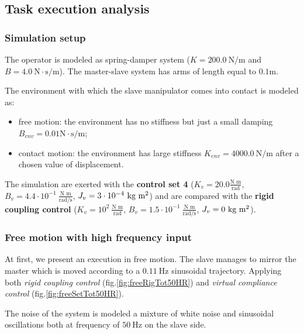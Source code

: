 \subsection{Task execution analysis}

\subsubsection*{Simulation setup}

The operator is modeled as spring-damper system ($ K=200.0 \ \text{N/m} $ and $ B=4.0 \ \text{N}\cdot\text{s}/\text{m} $). The master-slave system has arms of length equal to $ 0.1 \text{m} $. 

The environment with which the slave manipulator comes into contact is modeled as:
\begin{itemize}
	\item free motion: the environment has no stiffness but just a small damping $ B_{env}=0.01 \text{N}\cdot\text{s}/\text{m} $;
	\item contact motion: the environment has large stiffness $ K_{env} = 4000.0 \ \text{N/m} $ after a chosen value of displacement.
\end{itemize}

The simulation are exerted with the \textbf{control set 4} ($ K_v = 20.0 \frac{\text{N m}}{\text{rad}} $, $ B_v = 4.4\cdot 10^{-1} \ \frac{\text{N m}}{\text{rad/s}}$, $ J_v = 3\cdot 10^{-4} \ \text{kg m\textsuperscript{2}}$) and are compared with the \textbf{rigid coupling control} ($K_v = 10^{2} \ \frac{\text{N m}}{\text{rad}} $, $B_v = 1.5\cdot 10^{-1} \ \frac{\text{N m}}{\text{rad/s}}$, $J_v =  0 \ \text{kg m\textsuperscript{2}} $).

\subsubsection{Free motion with high frequency input}

At first, we present an execution in free motion. The slave manages to mirror the master which is moved according to a $ 0.11 \ \text{Hz} $ sinusoidal trajectory. Applying both \textsl{rigid coupling control} (fig.\ref{fig:freeRigTot50HR}) and \textsl{virtual compliance control} (fig.\ref{fig:freeSetTot50HR}).

The noise of the system is modeled a mixture of white noise and sinusoidal oscillations both at frequency of $50 \ \text{Hz}$ on the slave side.

